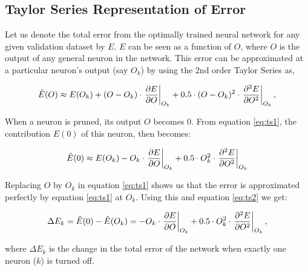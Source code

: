 \subsection{Taylor Series Representation of Error}
Let us denote the total error from the optimally trained neural network for any given validation dataset by $E$. $E$ can be seen as a function of $O$, where $O$ is the output of any general neuron in the network. This error can be approximated at a particular neuron's output (say $O_k$) by using the 2nd order Taylor Series as,

\begin{align}
\hat E(O) \approx E(O_k) + (O-O_k)\cdot \left.\pdv{E}{O}\right|_{O_k} +  0.5\cdot (O-O_k)^2\cdot \left.\pdv[2]{E}{O}\right|_{O_k}\label{eq:ts1},
\end{align}


When a neuron is pruned, its output $O$ becomes 0. From equation \ref{eq:ts1}, the contribution $E(0)$ of this neuron, then becomes:

\begin{align}
\hat E(0) \approx E(O_k) - O_k\cdot \left.\pdv{E}{O}\right|_{O_k} +  0.5\cdot O_k^2\cdot \left.\pdv[2]{E}{O}\right|_{O_k}\label{eq:ts2}
\end{align}

Replacing $O$ by $O_k$ in equation \ref{eq:ts1} shows us that the error is approximated perfectly by equation \ref{eq:ts1} at $O_k$. Using this and equation \ref{eq:ts2} we get:

\begin{align}
\Delta E_k = \hat E(0) - \hat E(O_k)= - O_k\cdot \left.\pdv{E}{O}\right|_{O_k} + 0.5\cdot O_k^2\cdot \left.\pdv[2]{E}{O}\right|_{O_k}\label{eq:ts3},
\end{align}

where $\Delta E_k$ is the change in the total error of the network when exactly one neuron ($k$) is turned off.

